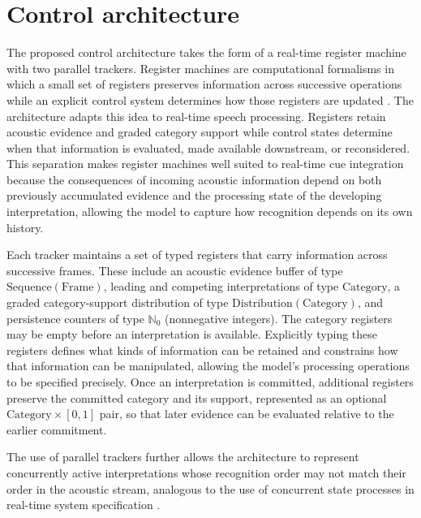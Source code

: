 \documentclass[12pt]{article}
\let\savedmathrm\mathrm
\let\mathrm\savedmathrm
\begin{document}
\section{Control architecture}

The proposed control architecture takes the form of a real-time register machine with two parallel trackers.
%
Register machines are computational formalisms in which a small set of registers preserves information across successive operations while an explicit control system determines how those registers are updated \citep{ShepherdsonSturgis1963}.
%
The architecture adapts this idea to real-time speech processing.
%
Registers retain acoustic evidence and graded category support while control states determine when that information is evaluated, made available downstream, or reconsidered.
%
This separation makes register machines well suited to real-time cue integration because the consequences of incoming acoustic information depend on both previously accumulated evidence and the processing state of the developing interpretation, allowing the model to capture how recognition depends on its own history.

Each tracker maintains a set of typed registers that carry information across successive frames.
%
These include an acoustic evidence buffer of type $\mathrm{Sequence}(\mathrm{Frame})$, leading and competing interpretations of type $\mathrm{Category}$, a graded category-support distribution of type $\mathrm{Distribution}(\mathrm{Category})$, and persistence counters of type $\mathbb{N}_0$ (nonnegative integers).
%
The category registers may be empty before an interpretation is available.
%
Explicitly typing these registers defines what kinds of information can be retained and constrains how that information can be manipulated, allowing the model's processing operations to be specified precisely.
%
Once an interpretation is committed, additional registers preserve the committed category and its support, represented as an optional $\mathrm{Category}\times[0,1]$ pair, so that later evidence can be evaluated relative to the earlier commitment.

The use of parallel trackers further allows the architecture to represent concurrently active interpretations whose recognition order may not match their order in the acoustic stream, analogous to the use of concurrent state processes in real-time system specification \citep{Harel1987}.
\end{document}

